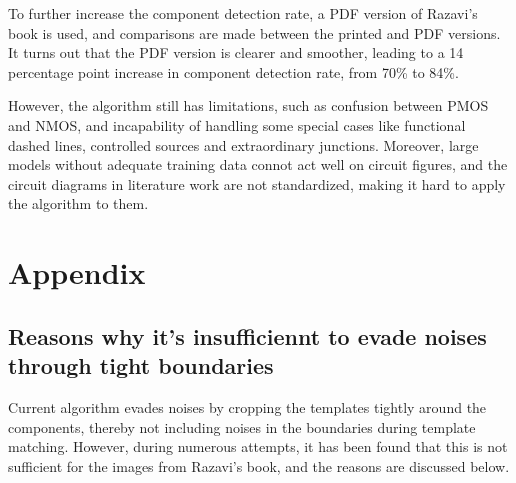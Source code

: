 \documentclass{article}
\begin{document}
To further increase the component detection rate, a PDF version of Razavi's book is used, and comparisons are made between the printed and PDF versions.
It turns out that the PDF version is clearer and smoother, leading to a 14 percentage point increase in component detection rate, from 70\% to 84\%.

However, the algorithm still has limitations, such as confusion between PMOS and NMOS, and incapability of handling some special cases like functional dashed lines, controlled sources and extraordinary junctions.
Moreover, large models without adequate training data connot act well on circuit figures, and the circuit diagrams in literature work are not standardized, making it hard to apply the algorithm to them.




\appendix

\section{Appendix}

\subsection{Reasons why it's insufficiennt to evade noises through tight boundaries}\label{subsec:tight_boundaries_insufficient}

Current algorithm\cite{shi2024amsnet} evades noises by cropping the templates tightly around the components, thereby not including noises in the boundaries during template matching.
However, during numerous attempts, it has been found that this is not sufficient for the images from Razavi's book, and the reasons are discussed below.
\end{document}

